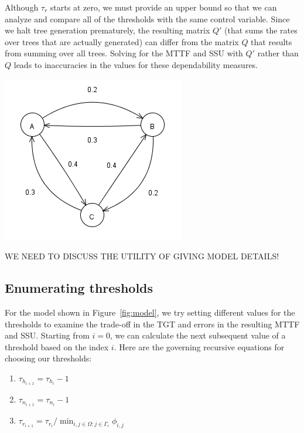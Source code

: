 \documentclass[12pt]{article}
\newcommand{\changed}[1]{#1}
\newcommand{\changed}[1]{\textcolor{red}{#1}}
\begin{document}
Although $\tau_r$ starts at zero, we must provide an upper bound so that we
can analyze and compare all of the thresholds with the same control variable.
Since we halt tree generation prematurely, the resulting matrix $Q'$ (that
sums the rates over trees that are actually generated) can differ from the
matrix $Q$ that results from summing over all trees. Solving for the MTTF and
SSU with $Q'$ rather than $Q$ leads to inaccuracies in the values for these
dependability measures.


\begin{minipage}[c]{\textwidth}
	\centering
	\includegraphics{simulation125model.png}
	\label{fig:model}
\end{minipage}

\vspace{1em}
\changed{WE NEED TO DISCUSS THE UTILITY OF GIVING MODEL DETAILS!}

\subsection{Enumerating thresholds}
For the model shown in Figure~\ref{fig:model}, we try setting different values
for the thresholds to examine the trade-off in the TGT and errors in the
resulting MTTF and SSU.  Starting from $i = 0$, we can calculate the next
subsequent value of a threshold based on the index $i$.  Here are \changed{the governing} recursive equations for \changed{choosing} our thresholds:

\begin{enumerate}
\item $\tau_{h_{i+1}} = \tau_{h_i} - 1$
\item $\tau_{n_{i+1}} = \tau_{n_i} - 1$
\item $\tau_{r_{i+1}} = \tau_{r_i} / \min_{i,j \in \Omega : j \in \Gamma_i} \phi_{i,j}$
\end{enumerate}
\end{document}
